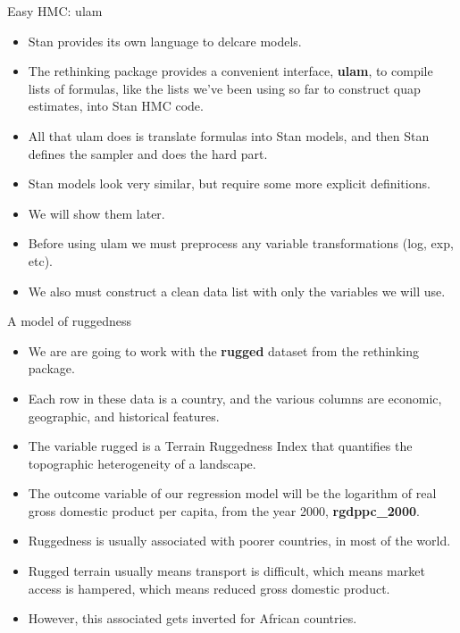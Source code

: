 \documentclass[handout]{beamer}
\begin{document}
\begin{frame}{Easy HMC: ulam}
\scriptsize{

\begin{itemize}
\item Stan provides its own language to delcare models.

\item  The rethinking package provides a convenient interface, \textbf{ulam}, to compile lists of formulas, like the lists we've been using so far to construct quap estimates, into Stan HMC
code.

\item All that ulam does is translate formulas into  Stan models, and then Stan defines
the sampler and does the hard part.

\item Stan models look very similar, but require some more explicit definitions.

\item We will show them later.

\item Before using ulam we must preprocess any variable transformations (log, exp, etc).

\item We also must construct a clean data list with only the variables we will use.



\end{itemize}




} 
\end{frame}


\begin{frame}{A model of ruggedness}
\scriptsize{

\begin{itemize}
\item We are are going to work with the \textbf{rugged} dataset from the rethinking package.
\item Each row in these data is a country, and the various columns are economic, geographic, and
historical features. 
\item The variable rugged is a Terrain Ruggedness Index that quantifies the topographic heterogeneity of a landscape. 

\item The outcome variable of our regression model will be the logarithm of real gross domestic product per capita, from the year 2000, \textbf{rgdppc\_2000}.

\item Ruggedness is usually associated with poorer countries, in most of the world.

\item Rugged terrain usually means transport is difficult, which means market access is hampered, which means reduced gross domestic product.

\item However, this associated gets inverted for African countries.


\end{itemize}




} 
\end{frame}
\end{document}
